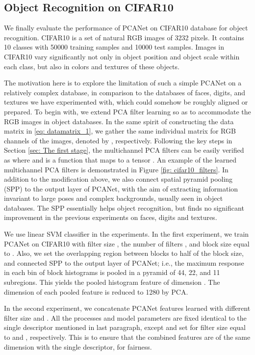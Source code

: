 \documentclass[10pt,journal,compsoc]{IEEEtran}
\begin{document}
\subsection{Object Recognition on CIFAR10}
We finally evaluate the performance of PCANet on CIFAR10 database for object recognition. CIFAR10 is a set of natural RGB images of 3232 pixels. It contains 10 classes with 50000 training samples and 10000 test samples. Images in CIFAR10 vary significantly not only in object position and object scale within each class, but also in colors and textures of these objects.

The motivation here is to explore the limitation of such a simple PCANet on a relatively complex database, in comparison to the databases of faces, digits, and textures we have experimented with, which could somehow be roughly aligned or prepared. To begin with, we extend PCA filter learning so as to accommodate the RGB images in object databases. In the same spirit of constructing the data matrix  in \eqref{eq: datamatrix_1}, we gather the same individual matrix for RGB channels of the images, denoted by , respectively. Following the key steps in Section \ref{sec: The first stage}, the multichannel PCA filters can be easily verified as
where  and  is a function that maps  to a tensor . An example of the learned multichannel PCA filters is demonstrated in Figure \ref{fig: cifar10_filters}. In addition to the modification above, we also connect spatial pyramid pooling (SPP) \cite{Grauman2005, Lazebnik2006, He2014} to the output layer of PCANet, with the aim of extracting information invariant to large poses and complex backgrounds, usually seen in object databases. The SPP essentially helps object recognition, but finds no significant improvement in the previous experiments on faces, digits and textures.

We use linear SVM classifier in the experiments. In the first experiment, we train PCANet on CIFAR10 with filter size , the number of filters , and block size equal to . Also, we set the overlapping region between blocks to half of the block size, and connected SPP to the output layer of PCANet; i.e., the maximum response in each bin of block histograms is pooled in a pyramid of 44, 22, and 11 subregions. This yields the  pooled histogram feature of dimension . The dimension of each pooled feature is reduced to 1280 by PCA.

In the second experiment, we concatenate PCANet features learned with different filter size  and . All the processes and model parameters are fixed identical to the single descriptor mentioned in last paragraph, except  and  set for filter size equal to  and , respectively. This is to ensure that the combined features are of the same dimension with the single descriptor, for fairness.
\end{document}
